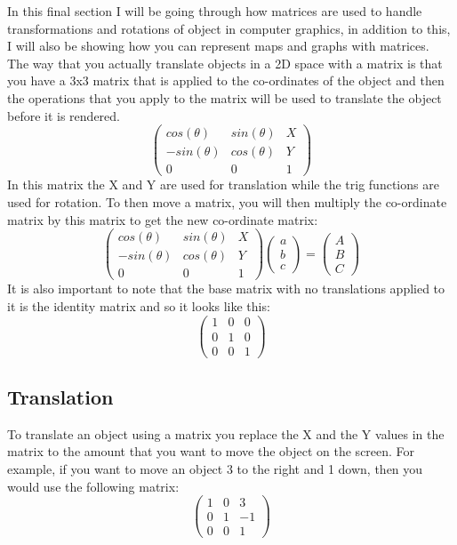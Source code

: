 \documentclass{article}
\begin{document}
In this final section I will be going through how matrices are used to handle transformations and rotations of object in computer graphics, in addition to this, I will also be showing how you can represent maps and graphs with matrices. 
\\
The way that you actually translate objects in a 2D space with a matrix is that you have a 3x3 matrix that is applied to the co-ordinates of the object and then the operations that you apply to the matrix will be used to translate the object before it is rendered. 
\[
	\begin{pmatrix}
		cos(\theta) & sin(\theta) & X\\
		-sin(\theta) & cos(\theta) & Y\\
		0 & 0 & 1
	\end{pmatrix}
\]
In this matrix the X and Y are used for translation while the trig functions are used for rotation. To then move a matrix, you will then multiply the co-ordinate matrix by this matrix to get the new co-ordinate matrix:
\[
	\begin{pmatrix}
		cos(\theta) & sin(\theta) & X\\
		-sin(\theta) & cos(\theta) & Y\\
		0 & 0 & 1
	\end{pmatrix}
	\begin{pmatrix}
		a\\
		b\\
		c
	\end{pmatrix}
	=
	\begin{pmatrix}
		A\\
		B\\
		C
	\end{pmatrix}
\]
It is also important to note that the base matrix with no translations applied to it is the identity matrix and so it looks like this:
\[
	\begin{pmatrix}
		1 & 0 & 0\\
		0 & 1 & 0\\
		0 & 0 & 1
	\end{pmatrix}
\]
\subsection{Translation}
To translate an object using a matrix you replace the X and the Y values in the matrix to the amount that you want to move the object on the screen. For example, if you want to move an object 3 to the right and 1 down, then you would use the following matrix:
\[
	\begin{pmatrix}
		1 & 0 & 3\\
		0 & 1 & -1\\
		0 & 0 & 1
	\end{pmatrix}
\]
\end{document}
